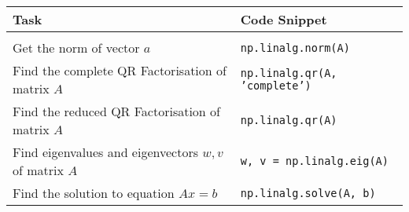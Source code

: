 \documentclass[a4paper,11pt]{article}
\begin{document}
\noindent \begin{tabular}{p{10cm} |p{5cm}}
  Task & Code Snippet \\
  \hline \\
Get the norm of vector \(a\) & \texttt{np.linalg.norm(A)} \\
Find the complete QR Factorisation of matrix \(A\) & \texttt{np.linalg.qr(A, 'complete')} \\
Find the reduced QR Factorisation of matrix \(A\) & \texttt{np.linalg.qr(A)}  \\
Find eigenvalues and eigenvectors \(w, v\) of matrix \(A\)  & \texttt{w, v = np.linalg.eig(A)} \\
Find the solution to equation \(Ax = b\)  & \texttt{np.linalg.solve(A, b)} \\
\end{tabular}
\end{document}
